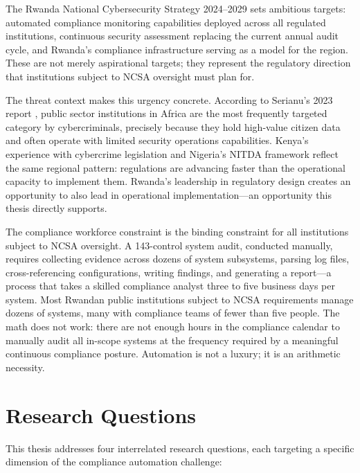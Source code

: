 \documentclass[12pt,oneside]{report}
\begin{document}
The Rwanda National Cybersecurity Strategy 2024--2029 \cite{rwanda_strategy_2024} sets ambitious targets: automated compliance monitoring capabilities deployed across all regulated institutions, continuous security assessment replacing the current annual audit cycle, and Rwanda's compliance infrastructure serving as a model for the region. These are not merely aspirational targets; they represent the regulatory direction that institutions subject to NCSA oversight must plan for.

The threat context makes this urgency concrete. According to Serianu's 2023 report \cite{serianu_africa}, public sector institutions in Africa are the most frequently targeted category by cybercriminals, precisely because they hold high-value citizen data and often operate with limited security operations capabilities. Kenya's experience with cybercrime legislation \cite{kenya_cyber_law} and Nigeria's NITDA framework \cite{nigeria_cyber} reflect the same regional pattern: regulations are advancing faster than the operational capacity to implement them. Rwanda's leadership in regulatory design creates an opportunity to also lead in operational implementation—an opportunity this thesis directly supports.

The compliance workforce constraint is the binding constraint for all institutions subject to NCSA oversight. A 143-control system audit, conducted manually, requires collecting evidence across dozens of system subsystems, parsing log files, cross-referencing configurations, writing findings, and generating a report—a process that takes a skilled compliance analyst three to five business days per system. Most Rwandan public institutions subject to NCSA requirements manage dozens of systems, many with compliance teams of fewer than five people. The math does not work: there are not enough hours in the compliance calendar to manually audit all in-scope systems at the frequency required by a meaningful continuous compliance posture. Automation is not a luxury; it is an arithmetic necessity.

\section{Research Questions}

This thesis addresses four interrelated research questions, each targeting a specific dimension of the compliance automation challenge:
\end{document}
